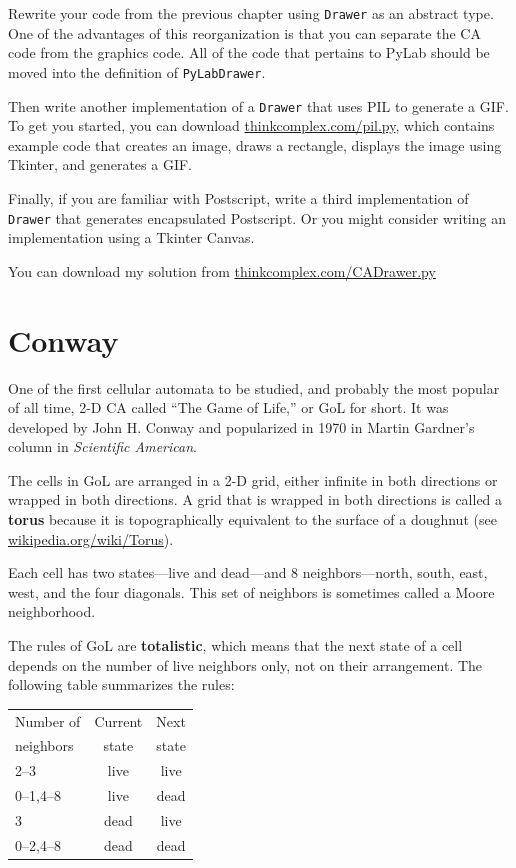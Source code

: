 \documentclass[10pt]{book}
\begin{document}
\begin{ex}

Rewrite your code from the previous chapter using {\tt Drawer}
as an abstract type.  One of the advantages of this reorganization
is that you can separate the CA code from the
graphics code.  All of the code that pertains to PyLab should
be moved into the definition of {\tt PyLabDrawer}.

Then write another implementation of a {\tt Drawer} that uses PIL
to generate a GIF.  To get you started, you can download
\url{thinkcomplex.com/pil.py}, which contains example
code that creates an image, draws a rectangle, displays the
image using Tkinter, and generates a GIF.

Finally, if you are familiar with Postscript, write a third
implementation of {\tt Drawer} that generates encapsulated
Postscript.  Or you might consider writing an implementation using
a Tkinter Canvas.

You can download my solution from
\url{thinkcomplex.com/CADrawer.py}

\end{ex}



\section{Conway}

One of the first cellular automata to be studied, and probably the
most popular of all time, 2-D CA called ``The Game of Life,'' or GoL
for short.  It was developed by John H. Conway and popularized in 1970
in Martin Gardner's column in {\em Scientific American}.

The cells in GoL are arranged in a 2-D grid, either infinite in both
directions or wrapped in both directions.  A grid that is wrapped
in both directions is called a {\bf torus} because it is topographically
equivalent to the surface of a doughnut (see \url{wikipedia.org/wiki/Torus}).

Each cell has two states---live and dead---and 8 neighbors---north,
south, east, west, and the four diagonals.  This set of neighbors
is sometimes called a Moore neighborhood.

The rules of GoL are {\bf totalistic}, which means that the next
state of a cell depends on the number of live neighbors only, 
not on their arrangement.  The following table summarizes the
rules:

\begin{tabular}{|l|c|c|}
\hline
Number of     &   Current      & Next \\
neighbors     &   state        & state \\
\hline
2--3          &   live           & live         \\
0--1,4--8     &   live           & dead         \\
3             &   dead           & live         \\
0--2,4--8     &   dead           & dead         \\
\hline
\end{tabular}
\end{document}
